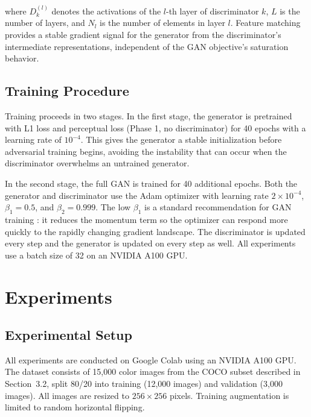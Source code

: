 \documentclass[12pt, a4paper, oneside]{report}
\begin{document}
    where $D_k^{(l)}$ denotes the activations of the $l$-th layer of discriminator
    $k$, $L$ is the number of layers, and $N_l$ is the number of elements in layer
    $l$. Feature matching provides a stable gradient signal for the generator from
    the discriminator's intermediate representations, independent of the GAN
    objective's saturation behavior.

\section{Training Procedure}

    Training proceeds in two stages. In the first stage, the generator is pretrained
    with L1 loss and perceptual loss (Phase 1, no discriminator) for 40 epochs with
    a learning rate of $10^{-4}$. This gives the generator a stable initialization
    before adversarial training begins, avoiding the instability that can occur when
    the discriminator overwhelms an untrained generator.

    In the second stage, the full GAN is trained for 40 additional epochs. Both the
    generator and discriminator use the Adam optimizer with learning rate
    $2 \times 10^{-4}$, $\beta_1 = 0.5$, and $\beta_2 = 0.999$. The low $\beta_1$
    is a standard recommendation for GAN training \cite{isola2017image}: it reduces
    the momentum term so the optimizer can respond more quickly to the rapidly
    changing gradient landscape. The discriminator is updated every step and the
    generator is updated on every step as well.
    All experiments use a batch size of 32 on an NVIDIA A100 GPU.


\chapter{Experiments}
\label{ch:experiments}

\section{Experimental Setup}

All experiments are conducted on Google Colab using an NVIDIA A100 GPU. The
dataset consists of 15,000 color images from the COCO subset described in
Section~3.2, split 80/20 into training (12,000 images) and validation (3,000
images). All images are resized to $256 \times 256$ pixels. Training augmentation
is limited to random horizontal flipping.
\end{document}
